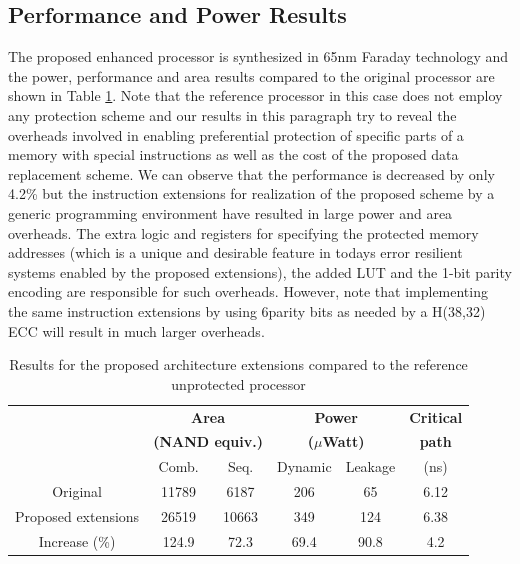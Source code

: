 \subsection{Performance and Power Results} \label{sec::soft_overhead}
The proposed enhanced processor is synthesized in 65nm Faraday technology and the power, performance and area results
compared to  the original processor are shown in Table \ref{tab:qos_overhead}. Note that the reference processor in this case does not employ any protection scheme and our results in this paragraph try to reveal the overheads involved in enabling 
preferential protection of specific parts of a memory with special instructions as well as the cost of the proposed data replacement scheme.  We can observe that the performance is decreased by only 4.2\% but the instruction extensions for realization of the proposed scheme by a generic programming environment have resulted in large power and area overheads. The extra logic and registers for specifying the protected memory addresses (which is a unique and desirable feature in todays error resilient systems enabled by the proposed extensions), the added LUT and the 1-bit parity encoding are responsible for such overheads. However, note that implementing the same instruction extensions by using 6parity bits as needed by a H(38,32) ECC will result in much larger overheads. 

\begin{table}[hbt]
\begin{center}
\caption{Results for the proposed architecture extensions compared to the reference unprotected processor }
     \label{tab:qos_overhead}
\begin{tabular}{|c|c|c|c|c|c|}\hline 
                  & \multicolumn{2}{c|}{\textbf{Area}} & \multicolumn{2}{c|}{\textbf{Power}} & \textbf{Critical} \\ 
                  & \multicolumn{2}{c|}{\textbf{(NAND equiv.)}} & \multicolumn{2}{c|}{\textbf{($\mu$Watt)}} & \textbf{path} \\ %
                  & Comb. & Seq. & Dynamic & Leakage & (ns) \\\hline
Original          & 11789         & 6187       & 206     & 65      & 6.12 \\\hline
Proposed extensions     & 26519         & 10663      & 349     & 124     & 6.38 \\\hline
Increase (\%)     & 124.9         & 72.3       & 69.4    & 90.8    & 4.2  \\\hline
\end{tabular}
\end{center}
\end{table}

